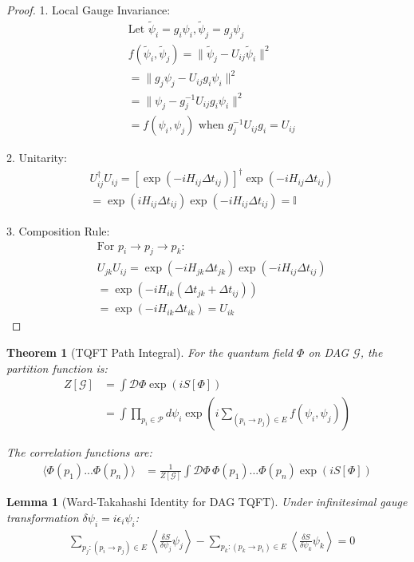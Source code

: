\documentclass{article}
\newtheorem{theorem}{Theorem}
\newtheorem{lemma}{Lemma}
\begin{document}
\begin{proof}
1. Local Gauge Invariance:
\begin{align*}
    &\text{Let } \tilde{\psi}_i = g_i\psi_i, \tilde{\psi}_j = g_j\psi_j \\
    &f(\tilde{\psi}_i, \tilde{\psi}_j) = \|\tilde{\psi}_j - U_{ij}\tilde{\psi}_i\|^2 \\
    &= \|g_j\psi_j - U_{ij}g_i\psi_i\|^2 \\
    &= \|\psi_j - g_j^{-1}U_{ij}g_i\psi_i\|^2 \\
    &= f(\psi_i, \psi_j) \text{ when } g_j^{-1}U_{ij}g_i = U_{ij}
\end{align*}

2. Unitarity:
\begin{align*}
    &U_{ij}^\dagger U_{ij} = [\exp(-iH_{ij}\Delta t_{ij})]^\dagger \exp(-iH_{ij}\Delta t_{ij}) \\
    &= \exp(iH_{ij}\Delta t_{ij})\exp(-iH_{ij}\Delta t_{ij}) = \mathbb{I}
\end{align*}

3. Composition Rule:
\begin{align*}
    &\text{For } p_i \to p_j \to p_k: \\
    &U_{jk}U_{ij} = \exp(-iH_{jk}\Delta t_{jk})\exp(-iH_{ij}\Delta t_{ij}) \\
    &= \exp(-iH_{ik}(\Delta t_{jk} + \Delta t_{ij})) \\
    &= \exp(-iH_{ik}\Delta t_{ik}) = U_{ik}
\end{align*}
\end{proof}

\begin{theorem}[TQFT Path Integral]
For the quantum field $\Phi$ on DAG $\mathcal{G}$, the partition function is:
\begin{align*}
    Z[\mathcal{G}] &= \int \mathcal{D}\Phi \exp(iS[\Phi]) \\
    &= \int \prod_{p_i \in \mathcal{P}} d\psi_i \exp\left(i\sum_{(p_i \to p_j) \in E} f(\psi_i, \psi_j)\right)
\end{align*}

The correlation functions are:
\begin{align*}
    \langle \Phi(p_1)...\Phi(p_n) \rangle &= \frac{1}{Z[\mathcal{G}]} \int \mathcal{D}\Phi \, \Phi(p_1)...\Phi(p_n) \exp(iS[\Phi])
\end{align*}
\end{theorem}

\begin{lemma}[Ward-Takahashi Identity for DAG TQFT]
Under infinitesimal gauge transformation $\delta\psi_i = i\epsilon_i\psi_i$:
\begin{align*}
    &\sum_{p_j: (p_i \to p_j) \in E} \left\langle \frac{\delta S}{\delta\psi_j} \psi_j \right\rangle - 
    \sum_{p_k: (p_k \to p_i) \in E} \left\langle \frac{\delta S}{\delta\psi_k} \psi_k \right\rangle = 0
\end{align*}
\end{lemma}
\end{document}
